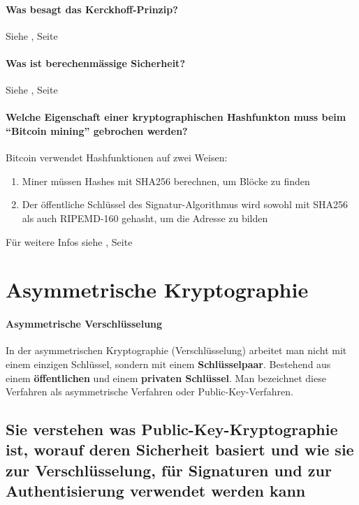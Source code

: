 \documentclass[10pt,a4paper]{article}
\begin{document}
\paragraph*{Was besagt das Kerckhoff-Prinzip?}{Siehe \underline{}, Seite \pageref{para:Kerckhoff's Prinzip}}

\paragraph*{Was ist berechenmässige Sicherheit?}{Siehe \underline{}, Seite \pageref{para:Berechenmässige Sicherheit}}

\paragraph*{Welche Eigenschaft einer kryptographischen Hashfunkton muss beim "`Bitcoin mining"' gebrochen werden?} Bitcoin verwendet Hashfunktionen auf zwei Weisen:
\begin{enumerate}[noitemsep,topsep=0pt,leftmargin=*]
    \item Miner müssen Hashes mit SHA256 berechnen, um Blöcke zu finden
    \item Der öffentliche Schlüssel des Signatur-Algorithmus wird sowohl mit SHA256 als auch RIPEMD-160 gehasht, um die Adresse zu bilden
\end{enumerate}{Für weitere Infos siehe \underline{}, Seite \pageref{para:Hashfunktion}}


\section{Asymmetrische Kryptographie}
\paragraph*{Asymmetrische Verschlüsselung}In der asymmetrischen Kryptographie (Verschlüsselung) arbeitet man nicht mit einem einzigen Schlüssel, sondern mit einem \textbf{Schlüsselpaar}. Bestehend aus einem \textbf{öffentlichen} und einem \textbf{privaten Schlüssel}. Man bezeichnet diese Verfahren als asymmetrische Verfahren oder \mbox{Public-Key-Verfahren}.

\subsection*{Sie verstehen was Public-Key-Kryptographie ist, worauf deren Sicherheit basiert und wie sie zur Verschlüsselung, für Signaturen und zur Authentisierung verwendet werden kann}
\end{document}

